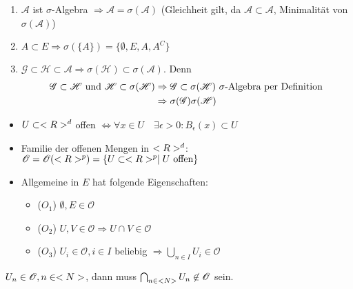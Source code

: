 \begin{remark}
	\begin{enumerate}[label=(\alph*)]
		\item $\mathscr{A}$ ist $\sigma$-Algebra $\Rightarrow \mathscr{A} = \sigma(\mathscr{A})$ (Gleichheit gilt, da $\mathscr{A} \subset \mathscr{A}$, Minimalität von $\sigma(\mathscr{A})$)
		\item $A \subset E \Rightarrow \sigma(\{A\}) = \{\emptyset, E, A, A^C\}$
		\item $\mathscr{G} \subset \mathscr{H} \subset \mathscr{A} \Rightarrow \sigma(\mathscr{H}) \subset \sigma(\mathscr{A})$. Denn
		\begin{align}
		\mathscr{G} \subset \mathscr{H} \text{ und } \mathscr{H} \subset \sigma(\mathscr{H}) &\Rightarrow \mathscr{G} \subset \sigma(\mathscr{H}) \text{ $\sigma$-Algebra per Definition}\notag \\
		&\Rightarrow \sigma(\mathscr{G})\sigma(\mathscr{H}) \notag
		\end{align}
	\end{enumerate}
\end{remark}

\begin{repetition}
	\begin{itemize}
		\item $U \subset <R>^{d}$ offen $\Leftrightarrow \forall x \in U \quad \exists \epsilon > 0 \colon B_{\epsilon}(x) \subset U$
		\item Familie der offenen Mengen in $<R>^d$: $\mathscr{O}  = \mathscr{O}(<R>^p) = \{ U \subset <R>^p \mid U \text{ offen}\}$
		\item Allgemeine  in $E$ hat folgende Eigenschaften:
		\begin{itemize}
			\item ($O_1$) $\emptyset, E \in \mathscr{O}$
			\item ($O_2$) $U,V \in \mathscr{O} \Rightarrow U \cap V \in \mathscr{O}$
			\item ($O_3$) $U_i \in \mathscr{O}, i \in I$ beliebig $\Rightarrow \bigcup_{n\in I} U_i \in \mathscr{O}$
		\end{itemize}
	\end{itemize}
\end{repetition}

\begin{hint}
	$U_n \in \mathscr{O}, n \in <N>$, dann muss $\bigcap_{n\in <N>} U_n \not \in \mathscr{O}$ sein.
\end{hint}


